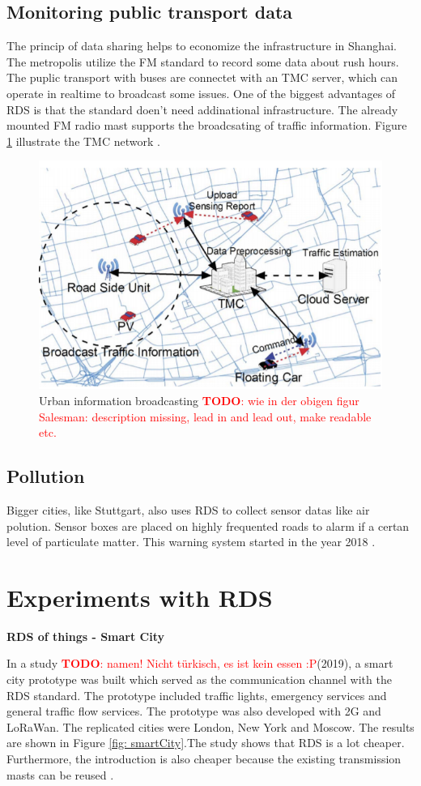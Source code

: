 \documentclass[conference,11pt,a4paper]{IEEEtran}
\newcommand{\todo}[1]{\textcolor{red}{\textbf{TODO}: #1}}
\begin{document}
	
	\subsection{Monitoring public transport data}
	
	The princip of data sharing helps to economize the infrastructure in Shanghai. The metropolis utilize the FM standard to record some data about rush hours. The puplic transport with buses are connectet with an TMC server, which can operate in realtime to broadcast some issues. One of the biggest advantages of RDS is that the standard doen't need addinational infrastructure. The already mounted FM radio mast supports the broadcsating of traffic information. Figure \ref{fig: monitoring} illustrate the TMC network \cite{Monitoring-du2014effective}.
	
	\begin{figure}[h]
		\centering
		\includegraphics[width =0.5 \linewidth]{img/monitoring}
		\caption{Urban information broadcasting \todo{wie in der obigen figur Salesman: description missing, lead in and lead out, make readable etc.}}
		\label{fig: monitoring}
	\end{figure}
	
	
	\subsection{Pollution}
	
	Bigger cities, like Stuttgart, also uses RDS to collect sensor datas like air polution. Sensor boxes are placed on highly frequented roads to alarm if a certan level of particulate matter. This warning system started in the year 2018 \cite{Stuttgart}.\\			 
	
	
	\section{Experiments with RDS} %
	\textbf{RDS of things - Smart City}
	
	In a study \todo{namen! Nicht türkisch, es ist kein essen :P}(2019), a smart city prototype was built which served as the communication channel with the RDS standard. The prototype included traffic lights, emergency services and general traffic flow services. The prototype was also developed with 2G and LoRaWan. The replicated cities were London, New York and Moscow. The results are shown in Figure \ref{fig: smartCity}.The study shows that RDS is a lot cheaper. Furthermore, the introduction is also cheaper because the existing transmission masts can be reused \cite{SmartCity-kutlay2019rds}.
	
\end{document}
